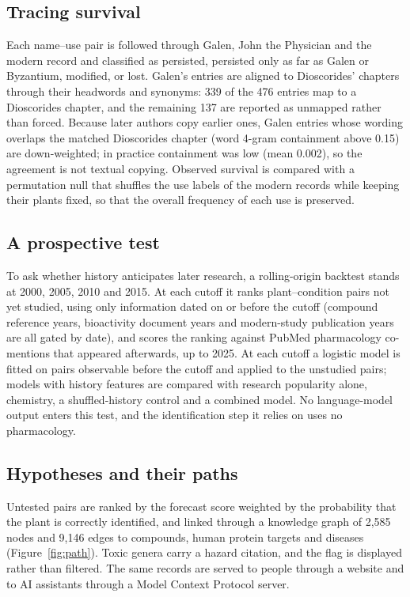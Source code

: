 \documentclass[11pt,a4paper]{article}
\begin{document}
\subsection{Tracing survival}
Each name–use pair is followed through Galen, John the Physician and the modern record and classified as persisted, persisted only as far as Galen or Byzantium, modified, or lost. Galen’s entries are aligned to Dioscorides’ chapters through their headwords and synonyms: 339 of the 476 entries map to a Dioscorides chapter, and the remaining 137 are reported as unmapped rather than forced. Because later authors copy earlier ones, Galen entries whose wording overlaps the matched Dioscorides chapter (word 4-gram containment above 0.15) are down-weighted; in practice containment was low (mean 0.002), so the agreement is not textual copying. Observed survival is compared with a permutation null that shuffles the use labels of the modern records while keeping their plants fixed, so that the overall frequency of each use is preserved.

\subsection{A prospective test}
To ask whether history anticipates later research, a rolling-origin backtest stands at 2000, 2005, 2010 and 2015. At each cutoff it ranks plant–condition pairs not yet studied, using only information dated on or before the cutoff (compound reference years, bioactivity document years and modern-study publication years are all gated by date), and scores the ranking against PubMed pharmacology co-mentions that appeared afterwards, up to 2025. At each cutoff a logistic model is fitted on pairs observable before the cutoff and applied to the unstudied pairs; models with history features are compared with research popularity alone, chemistry, a shuffled-history control and a combined model. No language-model output enters this test, and the identification step it relies on uses no pharmacology.

\subsection{Hypotheses and their paths}
Untested pairs are ranked by the forecast score weighted by the probability that the plant is correctly identified, and linked through a knowledge graph of 2,585 nodes and 9,146 edges to compounds, human protein targets and diseases (Figure~\ref{fig:path}). Toxic genera carry a hazard citation, and the flag is displayed rather than filtered. The same records are served to people through a website and to AI assistants through a Model Context Protocol server.
\end{document}
